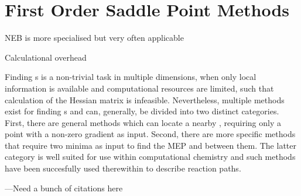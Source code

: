 \chapter{First Order Saddle Point Methods}
\label{chap:saddle-point-methods}

\bit
\item NEB is more specialised but very often applicable
\item Calculational overhead
\eit

Finding \sap{}s is a non-trivial task in multiple dimensions, when only local information is available and computational resources are limited, such that calculation of the Hessian matrix is infeasible.
Nevertheless, multiple methods exist for finding s and can, generally, be divided into two distinct categories.
First, there are general methods which can locate a nearby , requiring only a point with a non-zero gradient as input.
Second, there are more specific methods that require two minima as input to find the MEP and  between them.
The latter category is well suited for use within computational chemistry and such methods have been succesfully used therewithin to describe reaction paths.

---Need a bunch of citations here

\incomplete




